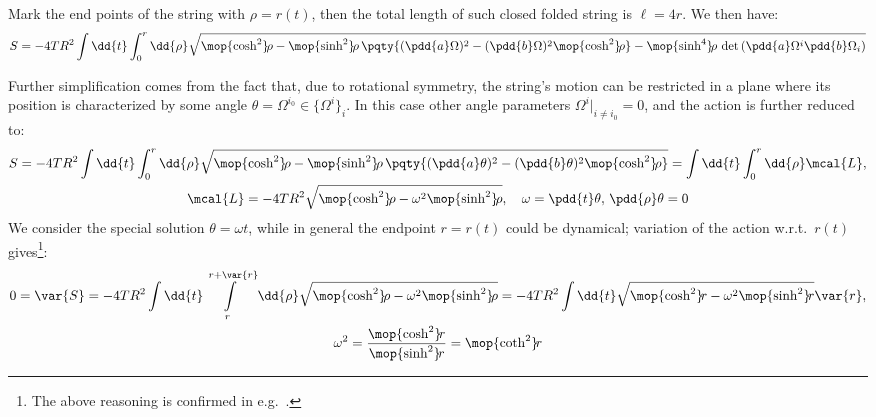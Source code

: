 \documentclass[a4paper,10pt]{article}
\newcommand{\oppower}[2]{\mop{{#1}^{#2}}\!}
\newcommand{\sqsinh}{\oppower{\sinh}{2}}
\newcommand{\sqcosh}{\oppower{\cosh}{2}}
\begin{document}
\begin{enumerate}
	Mark the end points of the string with $\rho = r(t)$, then the total length of such closed folded string is $\ell = 4r$. We then have:
	\begin{equation}
		S = -4TR^2 \int\dd{t} \int_0^r \dd{\rho}
		\sqrt{
			\oppower{\cosh}{2}\rho
			- \oppower{\sinh}{2}\rho\,\pqty{
				(\pdd{a}\Omega)^2
				- (\pdd{b}\Omega)^2
				\oppower{\cosh}{2}\rho
			}
			- \oppower{\sinh}{4}\rho\,
			\det\,(\pdd{a}\Omega^i\pdd{b}\Omega_i)
		}
	\end{equation}
\pagebreak[3]
	
	
	Further simplification comes from the fact that, due to rotational symmetry, the string's motion can be restricted in a plane where its position is characterized by some angle $\theta = \Omega^{i_0}\in \{\Omega^i\}_i$. In this case other angle parameters $\Omega^i|_{i\ne i_0} = 0$, and the action is further reduced to:
	\begin{gather}
		S = -4TR^2 \int\dd{t} \int_0^r \dd{\rho}
			\sqrt{
				\oppower{\cosh}{2}\rho
				- \oppower{\sinh}{2}\rho\,\pqty{
					(\pdd{a}\theta)^2
					- (\pdd{b}\theta)^2
					\oppower{\cosh}{2}\rho
				}
			}
		= \int\dd{t} \int_0^r \dd{\rho} \mcal{L},\\
		\mcal{L} = -4TR^2
			\sqrt{
				\oppower{\cosh}{2}\rho
				- \omega^2\oppower{\sinh}{2}\rho
			},\quad
			\omega = \pdd{t}\theta,\,
			\pdd{\rho}\theta = 0
	\end{gather}
	We consider the special solution $\theta = \omega t$, while in general the endpoint $r = r(t)$ could be dynamical; variation of the action w.r.t.\ $r(t)$ gives\footnote{
		The above reasoning is confirmed in e.g.\ .
	}:
	\begin{gather}
		0 = \var{S} = -4TR^2 \int\dd{t}
			\int\limits_r^{r+\var{r}} \dd{\rho}
			\sqrt{
				\oppower{\cosh}{2}\rho
				- \omega^2\oppower{\sinh}{2}\rho
			}
		= -4TR^2 \int\dd{t}
			\sqrt{
				\oppower{\cosh}{2}r
				- \omega^2\oppower{\sinh}{2}r
			} \var{r},\\
		\omega^2 = \frac{\sqcosh r}{\sqsinh r}
		= \oppower{\coth}{2} r
		\label{eq:string_endpt_constraint}
	\end{gather}
	

\end{enumerate}
\end{document}
